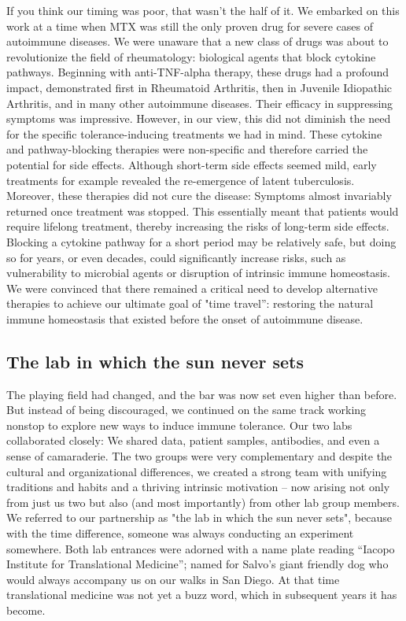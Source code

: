 \documentclass[authordate, editorial]{jote-new-article}
\begin{document}
	If you think our timing was poor, that wasn't the half of it. We embarked on this work at a time when MTX was still the only proven drug for severe cases of autoimmune diseases. We were unaware that a new class of drugs was about to revolutionize the field of rheumatology: biological agents that block cytokine pathways. Beginning with anti-TNF-alpha therapy, these drugs had a profound impact, demonstrated first in Rheumatoid Arthritis, then in Juvenile Idiopathic Arthritis, and in many other autoimmune diseases. Their efficacy in suppressing symptoms was impressive. However, in our view, this did not diminish the need for the specific tolerance-inducing treatments we had in mind. These cytokine and pathway-blocking therapies were non-specific and therefore carried the potential for side effects. Although short-term side effects seemed mild, early treatments for example revealed the re-emergence of latent tuberculosis. Moreover, these therapies did not cure the disease: Symptoms almost invariably returned once treatment was stopped. This essentially meant that patients would require lifelong treatment, thereby increasing the risks of long-term side effects. Blocking a cytokine pathway for a short period may be relatively safe, but doing so for years, or even decades, could significantly increase risks, such as vulnerability to microbial agents or disruption of intrinsic immune homeostasis. We were convinced that there remained a critical need to develop alternative therapies to achieve our ultimate goal of "time travel”: restoring the natural immune homeostasis that existed before the onset of autoimmune disease.







	\subsection{The lab in which the sun never sets}



	The playing field had changed, and the bar was now set even higher than before. But instead of being discouraged, we continued on the same track working nonstop to explore new ways to induce immune tolerance. Our two labs collaborated closely: We shared data, patient samples, antibodies, and even a sense of camaraderie. The two groups were very complementary and despite the cultural and organizational differences, we created a strong team with unifying traditions and habits and a thriving intrinsic motivation -- now arising not only from just us two but also (and most importantly) from other lab group members. We referred to our partnership as "the lab in which the sun never sets", because with the time difference, someone was always conducting an experiment somewhere. Both lab entrances were adorned with a name plate reading “Iacopo Institute for Translational Medicine”; named for Salvo's giant friendly dog who would always accompany us on our walks in San Diego. At that time translational medicine was not yet a buzz word, which in subsequent years it has become.
\end{document}
